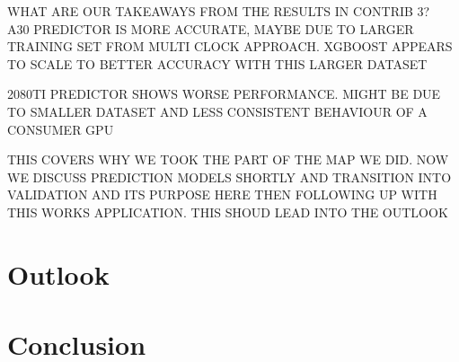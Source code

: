 




WHAT ARE OUR TAKEAWAYS FROM THE RESULTS IN CONTRIB 3?\\
A30 PREDICTOR IS MORE ACCURATE, MAYBE DUE TO LARGER TRAINING SET FROM MULTI CLOCK APPROACH. XGBOOST APPEARS TO SCALE TO BETTER ACCURACY WITH THIS LARGER DATASET  

2080TI PREDICTOR SHOWS WORSE PERFORMANCE. MIGHT BE DUE TO SMALLER DATASET AND LESS CONSISTENT BEHAVIOUR OF A CONSUMER GPU



THIS COVERS WHY WE TOOK THE PART OF THE MAP WE DID. NOW WE DISCUSS PREDICTION MODELS SHORTLY AND TRANSITION INTO VALIDATION AND ITS PURPOSE HERE THEN FOLLOWING UP WITH THIS WORKS APPLICATION. THIS SHOUD LEAD INTO THE OUTLOOK



\section{Outlook}

\section{Conclusion}
